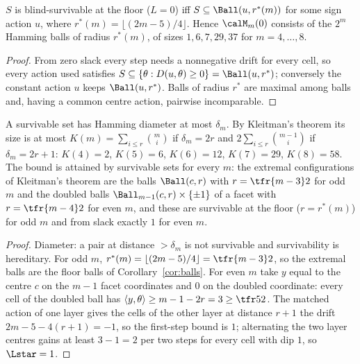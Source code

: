 \begin{corollary}\label{cor:balls}
$S$ is blind-survivable at the floor ($L=0$) iff $S\subseteq\Ball(u,r^\ast(m))$ for some sign action $u$, where $r^\ast(m)=\lfloor(2m-5)/4\rfloor$. Hence $\calM_m(0)$ consists of the $2^m$ Hamming balls of radius $r^\ast(m)$, of sizes $1,6,7,29,37$ for $m=4,\dots,8$.
\end{corollary}
\begin{proof}
From zero slack every step needs a nonnegative drift for every cell, so every action used satisfies $S\subseteq\{\theta:D(u,\theta)\ge0\}=\Ball(u,r^\ast)$; conversely the constant action $u$ keeps $\Ball(u,r^\ast)$. Balls of radius $r^\ast$ are maximal among balls and, having a common centre action, pairwise incomparable.
\end{proof}

\begin{corollary}\label{cor:kleitman}
A survivable set has Hamming diameter at most $\delta_m$. By Kleitman's theorem \cite{Kleitman1966} its size is at most $K(m)=\sum_{i\le r}\binom mi$ if $\delta_m=2r$ and $2\sum_{i\le r}\binom{m-1}i$ if $\delta_m=2r+1$: $K(4)=2$, $K(5)=6$, $K(6)=12$, $K(7)=29$, $K(8)=58$. The bound is attained by survivable sets for every $m$: the extremal configurations of Kleitman's theorem are the balls $\Ball(c,r)$ with $r=\tfr{m-3}2$ for odd $m$ and the doubled balls $\Ball_{m-1}(c,r)\times\{\pm1\}$ of a facet with $r=\tfr{m-4}2$ for even $m$, and these are survivable at the floor ($r=r^\ast(m)$) for odd $m$ and from slack exactly $1$ for even $m$.
\end{corollary}
\begin{proof}
Diameter: a pair at distance $>\delta_m$ is not survivable and survivability is hereditary. For odd $m$, $r^\ast(m)=\lfloor(2m-5)/4\rfloor=\tfr{m-3}2$, so the extremal balls are the floor balls of Corollary~\ref{cor:balls}. For even $m$ take $y$ equal to the centre $c$ on the $m-1$ facet coordinates and $0$ on the doubled coordinate: every cell of the doubled ball has $\langle y,\theta\rangle\ge m-1-2r=3\ge\tfr52$. The matched action of one layer gives the cells of the other layer at distance $r+1$ the drift $2m-5-4(r+1)=-1$, so the first-step bound is $1$; alternating the two layer centres gains at least $3-1=2$ per two steps for every cell with dip $1$, so $\Lstar=1$.
\end{proof}

